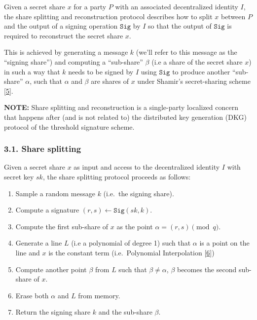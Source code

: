 \documentclass[
]{article}
\providecommand{\tightlist}{%
  \setlength{\itemsep}{0pt}\setlength{\parskip}{0pt}}
\begin{document}
Given a secret share \(x\) for a party \(P\) with an associated
decentralized identity \(I\), the share splitting and reconstruction
protocol describes how to split \(x\) between \(P\) and the output of a
signing operation \(\mathtt{Sig}\) by \(I\) so that the output of
\(\mathtt{Sig}\) is required to reconstruct the secret share \(x\).

This is achieved by generating a message \(k\) (we'll refer to this
message as the ``signing share'') and computing a ``sub-share''
\(\beta\) (i.e a share of the secret share \(x\)) in such a way that
\(k\) needs to be signed by \(I\) using \(\mathtt{Sig}\) to produce
another ``sub-share'' \(\alpha\), such that \(\alpha\) and \(\beta\) are
shares of \(x\) under Shamir's secret-sharing scheme
{[}\protect\hyperlink{ref-sss79}{5}{]}.

\textbf{NOTE:} Share splitting and reconstruction is a single-party
localized concern that happens after (and is not related to) the
distributed key generation (DKG) protocol of the threshold signature
scheme.

\hypertarget{share-splitting}{%
\subsubsection{3.1. Share splitting}\label{share-splitting}}

Given a secret share \(x\) as input and access to the decentralized
identity \(I\) with secret key \(sk\), the share splitting protocol
proceeds as follows:

\begin{enumerate}
\def\labelenumi{\arabic{enumi}.}
\tightlist
\item
  Sample a random message \(k\) (i.e.~the signing share).
\item
  Compute a signature \((r, s) \leftarrow \mathtt{Sig}(sk, k)\).
\item
  Compute the first sub-share of \(x\) as the point
  \(\alpha = (r, s) \pmod q\).
\item
  Generate a line \(L\) (i.e a polynomial of degree 1) such that
  \(\alpha\) is a point on the line and \(x\) is the constant term
  (i.e.~Polynomial Interpolation
  {[}\protect\hyperlink{ref-wiki:interpolation}{6}{]})
\item
  Compute another point \(\beta\) from \(L\) such that
  \(\beta \neq \alpha\), \(\beta\) becomes the second sub-share of
  \(x\).
\item
  Erase both \(\alpha\) and \(L\) from memory.
\item
  Return the signing share \(k\) and the sub-share \(\beta\).
\end{enumerate}
\end{document}
